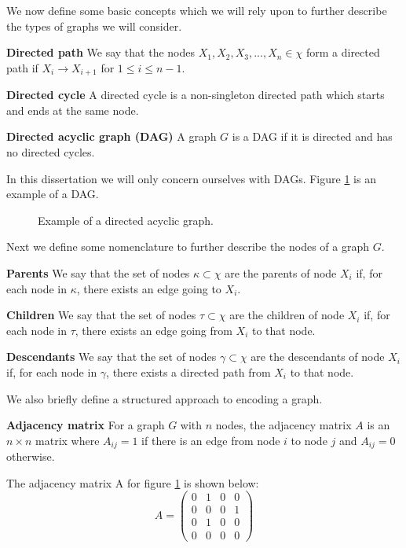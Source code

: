We now define some basic concepts which we will rely upon to further describe the types of graphs we will consider.
\begin{defn}
\textbf{Directed path} We say that the nodes $X_1, X_2, X_3,..., X_n \in \chi$ form a directed path if $X_i \rightarrow X_{i+1}$ for $1 \leq i \leq n-1$. 
\end{defn}
\begin{defn}
\textbf{Directed cycle} A directed cycle is a non-singleton directed path which starts and ends at the same node.
\end{defn}
\begin{defn}
\textbf{Directed acyclic graph (DAG)} A graph $G$ is a DAG if it is directed and has no directed cycles.
\end{defn}
In this dissertation we will only concern ourselves with DAGs. Figure \ref{fig_dag} is an example of a DAG.
\begin{figure}[H] 
\centering
{}
\caption{Example of a directed acyclic graph.}
\label{fig_dag}
\end{figure}
Next we define some nomenclature to further describe the nodes of a graph $G$.
\begin{defn}
\textbf{Parents} We say that the set of nodes $\kappa \subset \chi$ are the parents of node $X_i$ if, for each node in $\kappa$, there exists an edge going to $X_i$.
\end{defn}
\begin{defn}
\textbf{Children} We say that the set of nodes $\tau \subset \chi$ are the children of node $X_i$ if, for each node in $\tau$, there exists an edge going from $X_i$ to that node.
\end{defn}
\begin{defn}
\textbf{Descendants} We say that the set of nodes $\gamma \subset \chi$ are the descendants of node $X_i$ if, for each node in $\gamma$, there exists a directed path from $X_i$ to that node.
\end{defn}
We also briefly define a structured approach to encoding a graph.
\begin{defn}
\textbf{Adjacency matrix} For a graph $G$ with $n$ nodes, the adjacency matrix $A$ is an $n \times n$ matrix where $A_{ij} = 1$ if there is an edge from node $i$ to node $j$ and $A_{ij} = 0$ otherwise. 
\end{defn}
The adjacency matrix A for figure \ref{fig_dag} is shown below:
\begin{equation*}
A = \begin{pmatrix}
0 & 1 & 0 & 0 \\
0 & 0 & 0 & 1 \\
0 & 1 & 0 & 0 \\
0 & 0 & 0 & 0
\end{pmatrix}
\end{equation*}

